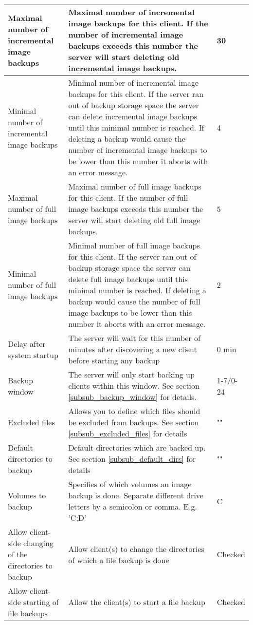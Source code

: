 \documentclass[a4paper,10pt]{article}
\begin{document}
\begin{longtable}{|p{}|p{}|p{}|}
\hline
Maximal number of incremental image backups & Maximal number of incremental image backups for this client. If the number of incremental image backups exceeds this number the server will start deleting old incremental image backups. & 30\\
\hline
Minimal number of incremental image backups & Minimal number of incremental image backups for this client. If the server ran out of backup storage space the server can delete incremental image backups until this minimal number is reached. If deleting a backup would cause the number of incremental image backups to be lower than this number it aborts with an error message. & 4\\
\hline
Maximal number of full image backups & Maximal number of full image backups for this client. If the number of
 full image backups exceeds this number the server will start deleting old full image backups. & 5\\
\hline
Minimal number of full image backups & Minimal number of full image backups for this client. If the server ran out of backup storage space the server can delete full image backups until this minimal number is reached. If deleting a backup would cause the number of full image backups to be lower than this number it aborts with an error message. & 2\\
\hline
Delay after system startup & The server will wait for this number of minutes after discovering a new client before starting any backup & 0 min\\
\hline
Backup window & The server will only start backing up clients within this window. See section \ref{subsub_backup_window} for details. & 1-7/0-24\\
\hline
Excluded files & Allows you to define which files should be excluded from backups. See section \ref{subsub_excluded_files} for details & "" \\
\hline
Default directories to backup & Default directories which are backed up. See section \ref{subsub_default_dirs} for details & ""\\
\hline
Volumes to backup & Specifies of which volumes an image backup is done. Separate different drive letters by a semicolon or comma. E.g. 'C;D' & C \\
\hline
Allow client-side changing of the directories to backup & Allow client(s) to change the directories of which a file backup is done & Checked \\
\hline
Allow client-side starting of file backups & Allow the client(s) to start a file backup & Checked \\

\end{longtable}
\end{document}
